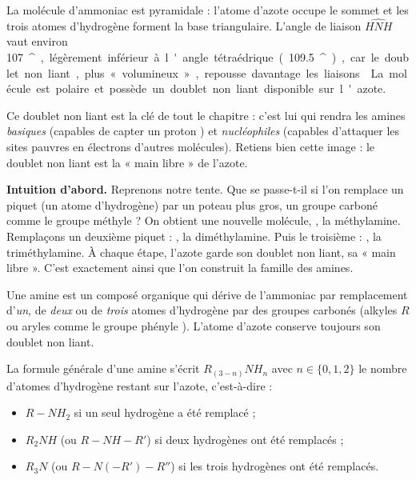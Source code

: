 \documentclass[11pt]{article}
\providecommand{\degree}{^{\circ}}
\newcommand{\cle}[1]{{\popxbold\color{popdark}#1}}
\newcounter{popsec}
\newcounter{popsub}
\newcommand{\courssub}[1]{%
  \stepcounter{popsub}%
  \par\vspace{9pt}\noindent{\popxbold\fontsize{11.5}{13}\selectfont\color{popink}{\color{poporange}\thepopsec.\thepopsub}\hspace{6pt}#1}\par\nopagebreak\vspace{4pt}
}
\begin{document}
\begin{propriete}
La molécule d'ammoniac  est \cle{pyramidale} : l'atome d'azote occupe le sommet et les trois atomes d'hydrogène forment la base triangulaire. L'angle de liaison $\widehat{HNH}$ vaut environ \SI{107}{\degree}, légèrement inférieur à l'angle tétraédrique (\SI{109,5}{\degree}), car le doublet non liant, plus « volumineux », repousse davantage les liaisons . La molécule est \cle{polaire} et possède un doublet non liant disponible sur l'azote.
\end{propriete}

Ce doublet non liant est la clé de tout le chapitre : c'est lui qui rendra les amines \emph{basiques} (capables de capter un proton ) et \emph{nucléophiles} (capables d'attaquer les sites pauvres en électrons d'autres molécules). Retiens bien cette image : le doublet non liant est la « main libre » de l'azote.

\courssub{Passage de l'ammoniac aux amines}

\textbf{Intuition d'abord.} Reprenons notre tente. Que se passe-t-il si l'on remplace un piquet (un atome d'hydrogène) par un poteau plus gros, un groupe carboné comme le groupe méthyle  ? On obtient une nouvelle molécule, , la méthylamine. Remplaçons un deuxième piquet : , la diméthylamine. Puis le troisième : , la triméthylamine. À chaque étape, l'azote garde son doublet non liant, sa « main libre ». C'est exactement ainsi que l'on construit la famille des amines.

\begin{definition}[Amine]
Une \cle{amine} est un composé organique qui dérive de l'ammoniac  par remplacement d'\emph{un}, de \emph{deux} ou de \emph{trois} atomes d'hydrogène par des groupes carbonés (alkyles $R$ ou aryles comme le groupe phényle ). L'atome d'azote conserve toujours son doublet non liant.
\end{definition}

La \cle{formule générale} d'une amine s'écrit $R_{(3-n)}NH_n$ avec $n \in \{0, 1, 2\}$ le nombre d'atomes d'hydrogène restant sur l'azote, c'est-à-dire :
\begin{itemize}
\item $R-NH_2$ si un seul hydrogène a été remplacé ;
\item $R_2NH$ (ou $R-NH-R'$) si deux hydrogènes ont été remplacés ;
\item $R_3N$ (ou $R-N(-R')-R''$) si les trois hydrogènes ont été remplacés.
\end{itemize}
\end{document}
